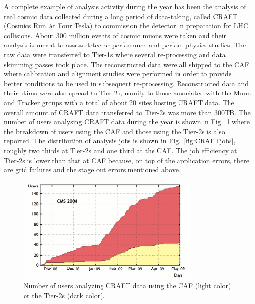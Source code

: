 A complete example of analysis activity during the year has been the analysis 
of real cosmic data collected during a long period of data-taking, called CRAFT (Cosmics Run At Four Tesla) to commission the detector in preparation for LHC collisions. About 300 million events of cosmic muons were taken and their analysis is meant to assess detector perfomance and perfom physics studies.
The raw data were transferred to Tier-1s where several re-processing and data skimming passes took place. The reconstructed data were all shipped to the CAF where calibration and alignment studies were performed in order to provide better conditions to be used in subsequent re-processing. 
Reconstructed data and their skims were also spread to Tier-2s, manily to 
those associated with the Muon and Tracker groups with a total of about 20 sites hosting CRAFT data. The overall amount of CRAFT data transferred to Tier-2s was more than 300TB.
The number of users analysing CRAFT data during the year is shown in Fig.~\ref{fig:CRAFTusers} where the breakdown of users using the CAF and those using the Tier-2s is also reported. The distribution of analysis jobs is shown in Fig.~\ref{fig:CRAFTjobs}, roughly two thirds at Tier-2s and one third at the CAF.
The job efficiency at Tier-2s is lower than that at CAF because, on top of the application errors, there are grid failures and the stage out errors mentioned above.
%
\begin{figure}
\centering
\includegraphics[width=0.80\textwidth]{CRAFTusers.eps}
\caption{Number of users analyzing CRAFT data using the CAF (light color) or the Tier-2s (dark color).}
\label{fig:CRAFTusers}
\end{figure}
